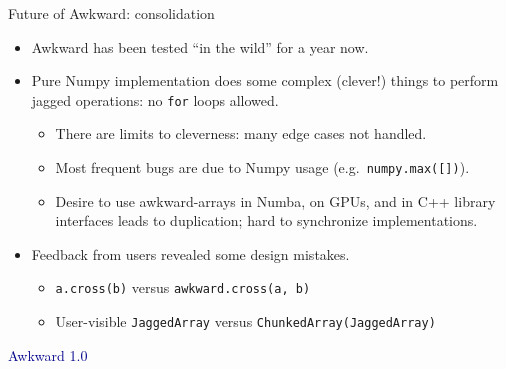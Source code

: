 \documentclass[aspectratio=169]{beamer}
\begin{document}
\begin{frame}{Future of Awkward: consolidation}
\Large
\vspace{0.35 cm}
\begin{itemize}\setlength{\itemsep}{0.25 cm}
\item<1-> Awkward has been tested ``in the wild'' for a year now.
\item<2-> Pure Numpy implementation does some complex (clever!) things to perform jagged operations: no \texttt{for} loops allowed.

\vspace{0.1 cm}
\begin{itemize}\setlength{\itemsep}{0.2 cm}
\item<3-> \large There are limits to cleverness: many edge cases not handled.
\item<4-> \large Most frequent bugs are due to Numpy usage (e.g.\ \texttt{numpy.max([])}).
\item<5-> \large Desire to use awkward-arrays in Numba, on GPUs, and in C++ library interfaces leads to duplication; hard to synchronize implementations.
\end{itemize}

\item<6-> Feedback from users revealed some design mistakes.

\vspace{0.1 cm}
\begin{itemize}\setlength{\itemsep}{0.2 cm}
\item<7-> \large \texttt{a.cross(b)} versus \texttt{awkward.cross(a, b)}
\item<8-> \large User-visible \texttt{JaggedArray} versus \texttt{ChunkedArray(JaggedArray)}
\end{itemize}
\end{itemize}
\end{frame}

\begin{frame}{}
\huge
\vspace{1 cm}
\begin{center}
\textcolor{darkblue}{Awkward 1.0}
\end{center}
\end{frame}
\end{document}
